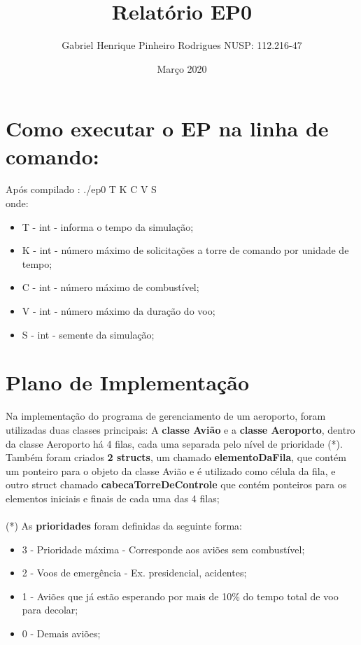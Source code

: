 \documentclass{article}
\title{Relatório EP0}
\author{Gabriel Henrique Pinheiro Rodrigues NUSP: 112.216-47}
\date{Março 2020}
\begin{document}
   \maketitle

   \section{Como executar o EP na linha de comando: }
Após compilado : ./ep0 T K C V S
\\
onde:
\begin{itemize}
   \item T - int - informa o tempo da simulação;
   \item K - int - número máximo de solicitações a torre de comando por unidade de tempo;
   \item C - int - número máximo de combustível;
   \item V - int - número máximo da duração do voo;
   \item S - int - semente da simulação;
   
\end{itemize}

\section{Plano de Implementação}
Na implementação do programa de gerenciamento de um aeroporto, foram utilizadas duas classes principais: A 
\textbf{classe Avião} e a \textbf{classe Aeroporto}, dentro da classe Aeroporto há 4 filas, cada uma separada pelo nível de
prioridade (*). Também foram criados \textbf{2 structs}, um chamado \textbf{elementoDaFila}, que contém
um ponteiro para o objeto da classe Avião e é utilizado como célula da fila, e outro struct chamado
\textbf{cabecaTorreDeControle} que contém ponteiros para os elementos iniciais e finais de cada uma das
4 filas;
\\\\
(*) As \textbf{prioridades} foram definidas da seguinte forma:
\begin{itemize}
   \item 3 - Prioridade máxima - Corresponde aos aviões sem combustível;
   \item 2 - Voos de emergência - Ex. presidencial, acidentes;
   \item 1 - Aviões que já estão esperando por mais de 10\% do tempo total de voo para decolar;
   \item 0 - Demais aviões;   
\end{itemize}
\end{document}
